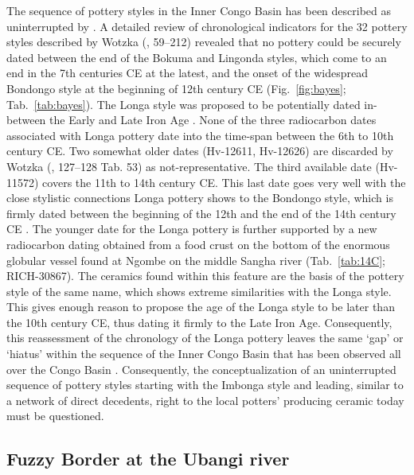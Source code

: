 \documentclass[smallextended,natbib]{svjour3}       %
\begin{document}
The sequence of pottery styles in the Inner Congo Basin has been described as uninterrupted by \cite{Wotzka.1995}. A detailed review of chronological indicators for the 32 pottery styles described by Wotzka (\citeyear{Wotzka.1995}, 59--212) revealed that no pottery could be securely dated between the end of the Bokuma and Lingonda styles, which come to an end in the 7th centuries CE at the latest, and the onset of the widespread Bondongo style at the beginning of 12th century CE (Fig.~\ref{fig:bayes}; Tab.~\ref{tab:bayes}). The Longa style was proposed to be potentially dated in-between the Early and Late Iron Age \citep[121–-128]{Wotzka.1995}. None of the three radiocarbon dates associated with Longa pottery date into the time-span between the 6th to 10th century CE. Two somewhat older dates (Hv-12611, Hv-12626) are discarded by Wotzka (\citeyear{Wotzka.1995}, 127--128 Tab. 53) as not-representative. The third available date (Hv-11572) covers the 11th to 14th century CE. This last date goes very well with the close stylistic connections Longa pottery shows to the Bondongo style, which is firmly dated between the beginning of the 12th and the end of the 14th century CE \citep[Fig.~\ref{fig:bayes}; \ref{fig:chrono}; Tab.~\ref{tab:bayes};][138 Tab.~58]{Wotzka.1995}. The younger date for the Longa pottery is further supported by a new radiocarbon dating obtained from a food crust on the bottom of the enormous globular vessel found at Ngombe on the middle Sangha river (Tab.~\ref{tab:14C}; RICH-30867). The ceramics found within this feature are the basis of the pottery style of the same name, which shows extreme similarities with the Longa style. This gives enough reason to propose the age of the Longa style to be later than the 10th century CE, thus dating it firmly to the Late Iron Age. Consequently, this reassessment of the chronology of the Longa pottery leaves the same ‘gap’ or ‘hiatus’ within the sequence of the Inner Congo Basin that has been observed all over the Congo Basin \citep{deSaulieu.2021a,Seidensticker.2021}. Consequently, the conceptualization of an uninterrupted sequence of pottery styles starting with the Imbonga style and leading, similar to a network of direct decedents, right to the local potters’ producing ceramic today \citep[65, 221, 274, 285]{Wotzka.1995} must be questioned.

\subsection*{Fuzzy Border at the Ubangi river}
\end{document}
